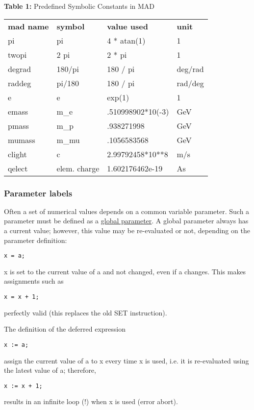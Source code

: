 \begin{table}
\begin{center}
{\textbf{Table 1:} Predefined Symbolic Constants in MAD}
\begin{tabular}{l|l|l|l}
\textbf{mad name} & \textbf{symbol} & \textbf{value used} & \textbf{unit} \\ 
pi & pi & 4 * atan(1) & 1 \\ 
twopi & 2 pi & 2 * pi & 1 \\ 
degrad & 180/pi & 180 / pi & deg/rad \\ 
raddeg & pi/180 & 180 / pi & rad/deg \\ 
e & e & exp(1) & 1 \\ 
emass & m\_e & .510998902*10(-3) & GeV \\ 
pmass & m\_p & .938271998 & GeV \\ 
mumass & m\_mu & .1056583568 & GeV \\ 
clight & c & 2.99792458*10**8 & m/s \\ 
qelect & elem. charge & 1.602176462e-19 & As
\end{tabular}
\end{center}
\end{table}

\subsubsection{Parameter labels} 
Often a set of numerical values depends on a common variable
parameter. Such a parameter must be defined as a
\href{parameter.html}{global parameter}. A global parameter always has a
current value; however, this value may be re-evaluated or not, depending
on the parameter definition:  
\begin{verbatim}
x = a;
\end{verbatim} 
x is set to the current value of a and not changed, even if a
changes. This makes assignments such as  
\begin{verbatim}
x = x + 1;
\end{verbatim} 
perfectly valid (this replaces the old SET instruction). 

The definition of the deferred expression  
\begin{verbatim}
x := a;
\end{verbatim} 
assign the current value of a to x every time x is used, i.e. it is
re-evaluated using the latest value of a; therefore,  
\begin{verbatim}
x := x + 1;
\end{verbatim} 
results in an infinite loop (!) when x is used (error abort). 

